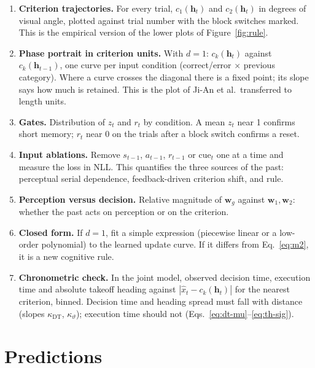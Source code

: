 \documentclass[11pt,a4paper]{article}
\newcommand{\vect}[1]{\bm{#1}}
\newcommand{\cue}{\mathrm{cue}}
\begin{document}
\begin{enumerate}[leftmargin=*]
\item \textbf{Criterion trajectories.} For every trial, $c_1(\vect{h}_t)$ and
      $c_2(\vect{h}_t)$ in degrees of visual angle, plotted against trial number with the
      block switches marked. This is the empirical version of the lower plots of
      Figure~\ref{fig:rule}.
\item \textbf{Phase portrait in criterion units.} With $d = 1$: $c_k(\vect{h}_t)$
      against $c_k(\vect{h}_{t-1})$, one curve per input condition (correct/error
      $\times$ previous category). Where a curve crosses the diagonal there is a fixed
      point; its slope says how much is retained. This is the plot of Ji-An et al.\
      transferred to length units.
\item \textbf{Gates.} Distribution of $z_t$ and $r_t$ by condition. A mean $z_t$ near 1
      confirms short memory; $r_t$ near 0 on the trials after a block switch confirms a
      reset.
\item \textbf{Input ablations.} Remove $s_{t-1}$, $a_{t-1}$, $r_{t-1}$ or $\cue_t$ one at
      a time and measure the loss in NLL. This quantifies the three sources of the past:
      perceptual serial dependence, feedback-driven criterion shift, and rule.
\item \textbf{Perception versus decision.} Relative magnitude of $\vect{w}_g$ against
      $\vect{w}_1, \vect{w}_2$: whether the past acts on perception or on the criterion.
\item \textbf{Closed form.} If $d = 1$, fit a simple expression (piecewise linear or a
      low-order polynomial) to the learned update curve. If it differs from
      Eq.~\eqref{eq:m2}, it is a new cognitive rule.
\item \textbf{Chronometric check.} In the joint model, observed decision time,
      execution time and absolute takeoff heading against $|\hat{x}_t - c_k(\vect{h}_t)|$
      for the nearest criterion, binned. Decision time and heading spread must fall with
      distance (slopes $\kappa_{\mathrm{DT}}$, $\kappa_{\vartheta}$); execution time
      should not (Eqs.~\eqref{eq:dt-mu}--\eqref{eq:th-sig}).
\end{enumerate}

\section{Predictions}
\label{sec:predictions}
\end{document}
